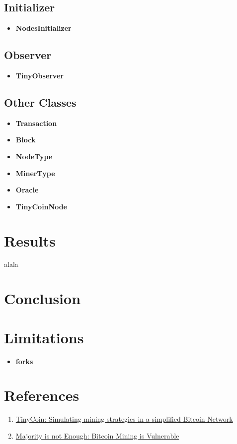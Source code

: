 \documentclass{article}
\begin{document}
\subsection{Initializer}
\begin{itemize}
\item \textbf{NodesInitializer}
\end{itemize}

\subsection{Observer}
\begin{itemize}
\item \textbf{TinyObserver}
\end{itemize}

\subsection{Other Classes} 
\begin{itemize}
\item \textbf{Transaction}
\item \textbf{Block}
\item \textbf{NodeType}
\item \textbf{MinerType}
\item \textbf{Oracle}
\item \textbf{TinyCoinNode}
\end{itemize}


\section{Results}



alala


\section{Conclusion}




\section{Limitations} 

\begin{itemize}
\item \textbf{forks}
\end{itemize}

\section{References} 
\begin{enumerate}
\item \href{https://elearning.di.unipi.it/pluginfile.php/14179/mod_assign/intro/SelfishMining.pdf}{TinyCoin: Simulating mining strategies in a simplified Bitcoin Network}
\item \href{https://elearning.di.unipi.it/pluginfile.php/14179/mod_assign/intro/MajorityisNotEnough.pdf}{Majority is not Enough: Bitcoin Mining is Vulnerable}
\end{enumerate}
\end{document}
